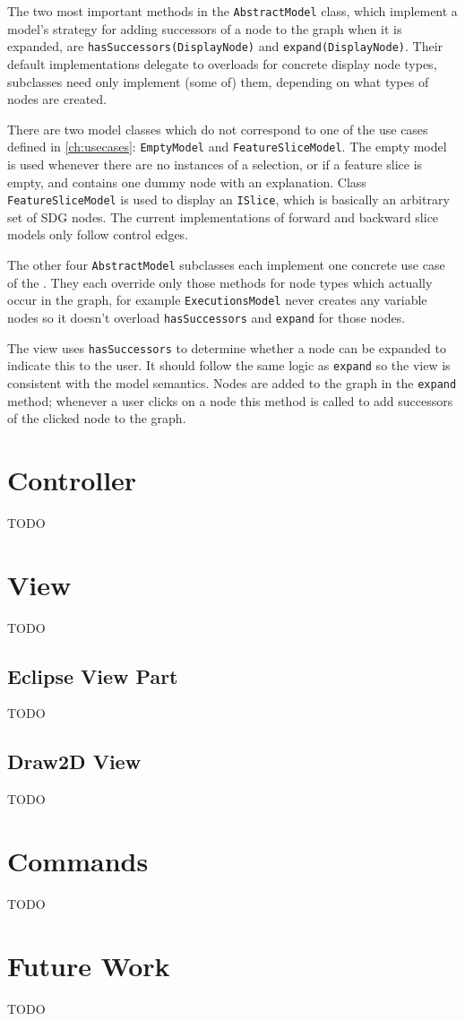 The two most important methods in the \lstinline|AbstractModel| class, which implement a model's strategy for adding 
successors of a node to the graph when it is expanded, are \lstinline|hasSuccessors(DisplayNode)| and 
\lstinline|expand(DisplayNode)|. Their default implementations delegate to overloads for concrete display node types, 
subclasses need only implement (some of) them, depending on what types of nodes are created.

There are two model classes which do not correspond to one of the use cases defined in \autoref{ch:usecases}: 
\lstinline|EmptyModel| and \lstinline|FeatureSliceModel|. The empty model is used whenever there are no instances of a 
selection, or if a feature slice is empty, and contains one dummy node with an explanation. Class 
\lstinline|FeatureSliceModel| is used to display an \lstinline|ISlice|, which is basically an arbitrary set of SDG 
nodes. The current implementations of forward and backward slice models only follow control edges.

The other four \lstinline|AbstractModel| subclasses each implement one concrete use case of the \SB. They each override 
only those methods for node types which actually occur in the graph, for example \lstinline|ExecutionsModel| never 
creates any variable nodes so it doesn't overload \lstinline|hasSuccessors| and \lstinline|expand| for those nodes.

The view uses \lstinline|hasSuccessors| to determine whether a node can be expanded to indicate this to the user. It 
should follow the same logic as \lstinline|expand| so the view is consistent with the model semantics. Nodes are added 
to the graph in the \lstinline|expand| method; whenever a user clicks on a node this method is called to add successors 
of the clicked node to the graph.


\section{Controller}

TODO


\section{View}

TODO

\subsection{Eclipse View Part}

TODO

\subsection{Draw2D View}

TODO


\section{Commands}

TODO


\section{Future Work}

TODO
